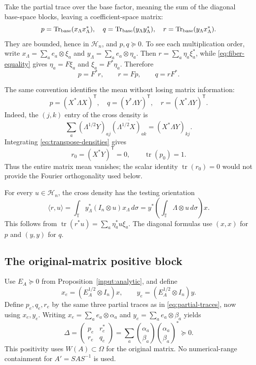 \documentclass[11pt]{article}
\newcommand{\T}{\mathbb T}
\newcommand{\cH}{\mathcal H}
\DeclareMathOperator{\tr}{tr}
\theoremstyle{definition}
\theoremstyle{remark}
\numberwithin{equation}{section}
\begin{document}
Take the partial trace over the base factor, meaning the sum of the
diagonal base-space blocks, leaving a coefficient-space matrix:
\begin{equation}\label{eq:partial-traces}
 p=\operatorname{Tr}_{\rm base}(x_\Lambda x_\Lambda^*),\quad
 q=\operatorname{Tr}_{\rm base}(y_\Lambda y_\Lambda^*),\quad
 r=\operatorname{Tr}_{\rm base}(y_\Lambda x_\Lambda^*).
\end{equation}
They are bounded, hence in $\cH_n$, and $p,q\succeq0$. To see each
multiplication order, write
$x_\Lambda=\sum_a e_a\otimes\xi_a$ and
$y_\Lambda=\sum_a e_a\otimes\eta_a$. Then
$r=\sum_a\eta_a\xi_a^*$, while \eqref{eq:fiber-equality} gives
$\eta_a=F\xi_a$ and $\xi_a=F^*\eta_a$. Therefore
\begin{equation}\label{eq:ordered-densities}
 p=F^*r,\qquad r=Fp,\qquad q=rF^*.
\end{equation}

The same convention identifies the mean without losing matrix information:
\begin{equation}\label{eq:transpose-densities}
 p=(X^*\Lambda X)^{\mathsf T},\quad
 q=(Y^*\Lambda Y)^{\mathsf T},\quad
 r=(X^*\Lambda Y)^{\mathsf T}.
\end{equation}
Indeed, the $(j,k)$ entry of the cross density is
\[
 \sum_a(\Lambda^{1/2}Y)_{aj}
       \overline{(\Lambda^{1/2}X)_{ak}}
 =(X^*\Lambda Y)_{kj}.
\]
Integrating \eqref{eq:transpose-densities} gives
\begin{equation}\label{eq:matrix-zero}
 r_0=(X^*Y)^{\mathsf T}=0,\qquad \tr(p_0)=1.
\end{equation}
Thus the entire matrix mean vanishes; the scalar identity $\tr(r_0)=0$
would not provide the Fourier orthogonality used below.

For every $u\in\cH_n$, the cross density has the testing orientation
\begin{equation}\label{eq:testing}
 \langle r,u\rangle
 =\int_\T y_\Lambda^*(I_n\otimes u)x_\Lambda\,d\sigma
 =y^*\left(\int_\T\Lambda\otimes u\,d\sigma\right)x.
\end{equation}
This follows from $\tr(r^*u)=\sum_a\eta_a^*u\xi_a$.
The diagonal formulas use $(x,x)$ for $p$ and $(y,y)$ for $q$.

\subsection{The original-matrix positive block}
Use $E_A\succeq0$ from Proposition~\ref{input:analytic}, and define
\[
 x_e=(E_A^{1/2}\otimes I_n)x,\qquad
 y_e=(E_A^{1/2}\otimes I_n)y.
\]
Define $p_e,q_e,r_e$ by the same three partial traces as in
\eqref{eq:partial-traces}, now using $x_e,y_e$.
Writing $x_e=\sum_a e_a\otimes\alpha_a$ and
$y_e=\sum_a e_a\otimes\beta_a$ yields
\begin{equation}\label{eq:positive-block}
 \Delta=\begin{pmatrix}p_e&r_e^*\\r_e&q_e\end{pmatrix}
 =\sum_a\binom{\alpha_a}{\beta_a}
          \binom{\alpha_a}{\beta_a}^{\!*}\succeq0.
\end{equation}
This positivity uses $W(A)\subset\Omega$ for the original matrix.
No numerical-range containment for $A'=SAS^{-1}$ is used.
\end{document}
